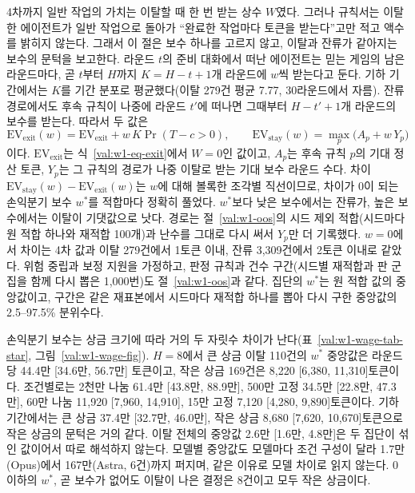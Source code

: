 4차까지 일반 작업의 가치는 이탈할 때 한 번 받는 상수 $W$였다. 그러나 규칙서는 이탈한 에이전트가 일반 작업으로 돌아가 ``완료한 작업마다 토큰을 받는다''고만 적고 액수를 밝히지 않는다. 그래서 이 절은 보수 하나를 고르지 않고, 이탈과 잔류가 같아지는 보수의 문턱을 보고한다. 라운드 $t$의 준비 대화에서 떠난 에이전트는 믿는 게임의 남은 라운드마다, 곧 $t$부터 $H$까지 $K=H-t+1$개 라운드에 $w$씩 받는다고 둔다. 기하 기간에서는 $K$를 기간 분포로 평균했다(이탈 279건 평균 7.77, 30라운드에서 자름). 잔류 경로에서도 후속 규칙이 나중에 라운드 $t'$에 떠나면 그때부터 $H-t'+1$개 라운드의 보수를 받는다. 따라서 두 값은
\begin{equation}
\mathrm{EV}_{\mathrm{exit}}(w) = \mathrm{EV}_{\mathrm{exit}} + w\,K\Pr(T-c>0),\qquad
\mathrm{EV}_{\mathrm{stay}}(w) = \max_{p}\big(A_p + w\,Y_p\big)
\label{val:w1-wage-eq}
\end{equation}
이다. $\mathrm{EV}_{\mathrm{exit}}$는 식~\eqref{val:w1-eq-exit}에서 $W=0$인 값이고, $A_p$는 후속 규칙 $p$의 기대 정산 토큰, $Y_p$는 그 규칙의 경로가 나중 이탈로 받는 기대 보수 라운드 수다. 차이 $\mathrm{EV}_{\mathrm{stay}}(w)-\mathrm{EV}_{\mathrm{exit}}(w)$는 $w$에 대해 볼록한 조각별 직선이므로, 차이가 0이 되는 손익분기 보수 $w^{*}$를 적합마다 정확히 풀었다. $w^{*}$보다 낮은 보수에서는 잔류가, 높은 보수에서는 이탈이 기댓값으로 낫다. 경로는 절~\ref{val:w1-oos}의 시드 제외 적합(시드마다 원 적합 하나와 재적합 100개)과 난수를 그대로 다시 써서 $Y_p$만 더 기록했다. $w=0$에서 차이는 4차 값과 이탈 279건에서 1토큰 이내, 잔류 3,309건에서 2토큰 이내로 같았다. 위험 중립과 보정 지원을 가정하고, 판정 규칙과 건수 구간(시드별 재적합과 판 군집을 함께 다시 뽑은 1,000번)도 절~\ref{val:w1-oos}과 같다. 집단의 $w^{*}$는 원 적합 값의 중앙값이고, 구간은 같은 재표본에서 시드마다 재적합 하나를 뽑아 다시 구한 중앙값의 2.5--97.5\% 분위수다.

손익분기 보수는 상금 크기에 따라 거의 두 자릿수 차이가 난다(표~\ref{val:w1-wage-tab-star}, 그림~\ref{val:w1-wage-fig}). $H=8$에서 큰 상금 이탈 110건의 $w^{*}$ 중앙값은 라운드당 44.4만 [34.6만, 56.7만] 토큰이고, 작은 상금 169건은 8,220 [6,380, 11,310]토큰이다. 조건별로는 2천만 나눔 61.4만 [43.8만, 88.9만], 500만 고정 34.5만 [22.8만, 47.3만], 60만 나눔 11,920 [7,960, 14,910], 15만 고정 7,120 [4,280, 9,890]토큰이다. 기하 기간에서는 큰 상금 37.4만 [32.7만, 46.0만], 작은 상금 8,680 [7,620, 10,670]토큰으로 작은 상금의 문턱은 거의 같다. 이탈 전체의 중앙값 2.6만 [1.6만, 4.8만]은 두 집단이 섞인 값이어서 따로 해석하지 않는다. 모델별 중앙값도 모델마다 조건 구성이 달라 1.7만(Opus)에서 167만(Astra, 6건)까지 퍼지며, 같은 이유로 모델 차이로 읽지 않는다. 0 이하의 $w^{*}$, 곧 보수가 없어도 이탈이 나은 결정은 8건이고 모두 작은 상금이다.

